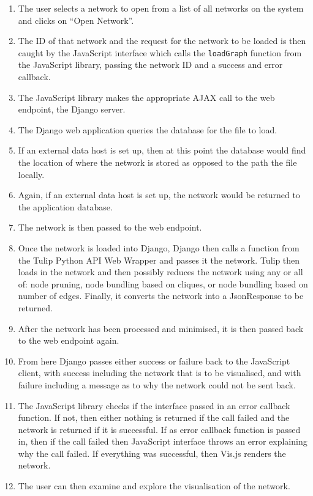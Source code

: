 \documentclass[../dissertation.tex]{subfiles}
\begin{document}
\begin{enumerate}
    \item The user selects a network to open from a list of all networks on the system and clicks on ``Open Network''.
    \item The ID of that network and the request for the network to be loaded is then caught by the JavaScript interface which calls the \texttt{loadGraph} function from the JavaScript library, passing the network ID and a success and error callback.
    \item The JavaScript library makes the appropriate AJAX call to the web endpoint, the Django server.
    \item The Django web application queries the database for the file to load.
    \item If an external data host is set up, then at this point the database would find the location of where the network is stored as opposed to the path the file locally.
    \item Again, if an external data host is set up, the network would be returned to the application database.
    \item The network is then passed to the web endpoint.
    \item Once the network is loaded into Django, Django then calls a function from the Tulip Python API Web Wrapper and passes it the network. Tulip then loads in the network and then possibly reduces the network using any or all of: node pruning, node bundling based on cliques, or node bundling based on number of edges. Finally, it converts the network into a JsonResponse to be returned.
    \item After the network has been processed and minimised, it is then passed back to the web endpoint again.
    \item From here Django passes either success or failure back to the JavaScript client, with success including the network that is to be visualised, and with failure including a message as to why the network could not be sent back.
    \item The JavaScript library checks if the interface passed in an error callback function. If not, then either nothing is returned if the call failed and the network is returned if it is successful. If as error callback function is passed in, then if the call failed then JavaScript interface throws an error explaining why the call failed. If everything was successful, then Vis.js renders the network.
    \item The user can then examine and explore the visualisation of the network.
\end{enumerate}
\end{document}
